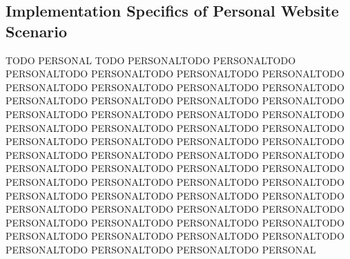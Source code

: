 \subsection{Implementation Specifics of Personal Website Scenario}\label{subsec:implementation-specifics-of-personal-website-scenario}
TODO PERSONAL TODO PERSONALTODO PERSONALTODO PERSONALTODO PERSONALTODO PERSONALTODO PERSONALTODO PERSONALTODO PERSONALTODO PERSONALTODO PERSONALTODO PERSONALTODO PERSONALTODO PERSONALTODO PERSONALTODO PERSONALTODO PERSONALTODO PERSONALTODO PERSONALTODO PERSONALTODO PERSONALTODO PERSONALTODO PERSONALTODO PERSONALTODO PERSONALTODO PERSONALTODO PERSONALTODO PERSONALTODO PERSONALTODO PERSONALTODO PERSONALTODO PERSONALTODO PERSONALTODO PERSONALTODO PERSONALTODO PERSONALTODO PERSONALTODO PERSONALTODO PERSONALTODO PERSONALTODO PERSONALTODO PERSONALTODO PERSONALTODO PERSONALTODO PERSONALTODO PERSONALTODO PERSONALTODO PERSONALTODO PERSONALTODO PERSONALTODO PERSONALTODO PERSONALTODO PERSONALTODO PERSONALTODO PERSONALTODO PERSONALTODO PERSONALTODO PERSONALTODO PERSONAL
